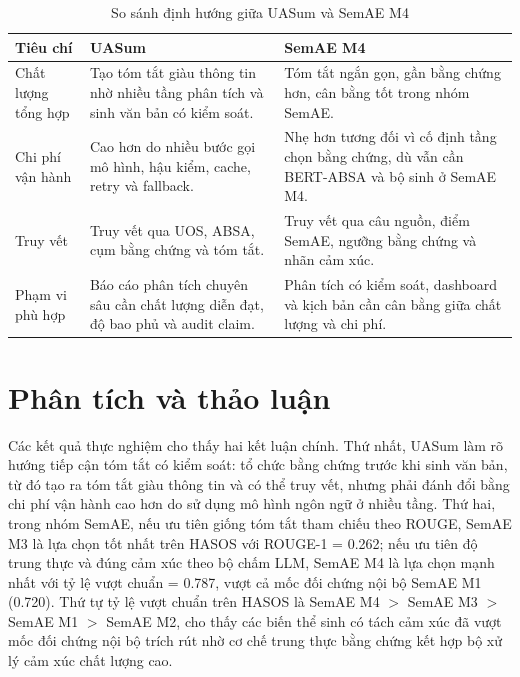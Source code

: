 \begin{table}[tbp]
\centering
\caption{So sánh định hướng giữa UASum và SemAE M4}
\label{tab:method-cost-quality-comparison}
\small
\setlength{\tabcolsep}{4pt}
\renewcommand{\arraystretch}{1.15}
\begin{tabularx}{\textwidth}{L{0.22\textwidth} Y Y}
\toprule
\textbf{Tiêu chí} & \textbf{UASum} & \textbf{SemAE M4} \\
\midrule
Chất lượng tổng hợp & Tạo tóm tắt giàu thông tin nhờ nhiều tầng phân tích và sinh văn bản có kiểm soát. & Tóm tắt ngắn gọn, gần bằng chứng hơn, cân bằng tốt trong nhóm SemAE. \\
Chi phí vận hành & Cao hơn do nhiều bước gọi mô hình, hậu kiểm, cache, retry và fallback. & Nhẹ hơn tương đối vì cố định tầng chọn bằng chứng, dù vẫn cần BERT-ABSA và bộ sinh ở SemAE M4. \\
Truy vết & Truy vết qua UOS, ABSA, cụm bằng chứng và tóm tắt. & Truy vết qua câu nguồn, điểm SemAE, ngưỡng bằng chứng và nhãn cảm xúc. \\
Phạm vi phù hợp & Báo cáo phân tích chuyên sâu cần chất lượng diễn đạt, độ bao phủ và audit claim. & Phân tích có kiểm soát, dashboard và kịch bản cần cân bằng giữa chất lượng và chi phí. \\
\bottomrule
\end{tabularx}
\end{table}

\section{Phân tích và thảo luận}

Các kết quả thực nghiệm cho thấy hai kết luận chính. Thứ nhất, UASum làm rõ
hướng tiếp cận tóm tắt có kiểm soát: tổ chức bằng chứng trước khi sinh văn bản,
từ đó tạo ra tóm tắt giàu thông tin và có thể truy vết, nhưng phải đánh đổi
bằng chi phí vận hành cao hơn do sử dụng mô hình ngôn ngữ ở nhiều tầng. Thứ
hai, trong nhóm SemAE, nếu ưu tiên giống tóm tắt tham chiếu theo ROUGE, SemAE M3 là
lựa chọn tốt nhất trên HASOS với ROUGE-1 = \num{0.262}; nếu ưu tiên độ trung
thực và đúng cảm xúc theo bộ chấm LLM, SemAE M4 là lựa chọn mạnh nhất với tỷ lệ vượt
chuẩn = \num{0.787}, vượt cả mốc đối chứng nội bộ SemAE M1 (\num{0.720}). Thứ tự tỷ
lệ vượt chuẩn trên HASOS là SemAE M4 $>$ SemAE M3 $>$ SemAE M1 $>$ SemAE M2, cho thấy các biến thể sinh
có tách cảm xúc đã vượt mốc đối chứng nội bộ trích rút nhờ cơ chế trung thực bằng chứng
kết hợp bộ xử lý cảm xúc chất lượng cao.

